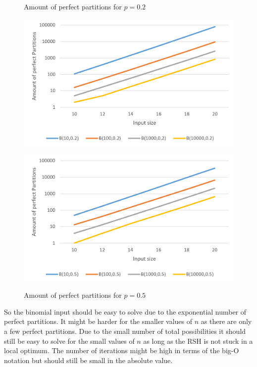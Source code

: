 \begin{figure}[h]
      \centering
      \begin{minipage}[b]{0.45\textwidth}
            \caption{Amount of perfect partitions for $p=0.2$}
            \includegraphics[width=\textwidth]{figures/images/solvabilityOfInputs/perfectPartitionCount-p0_2.png}
      \end{minipage}
      \hspace{0.75cm}
      \begin{minipage}[b]{0.45\textwidth}
            \caption{Amount of perfect partitions for $p=0.5$}
            \includegraphics[width=\textwidth]{figures/images/solvabilityOfInputs/perfectPartitionCount-p0_5.png}\label{fig:lastBinSolCount}
      \end{minipage}
\end{figure}

So the binomial input should be easy to solve due to the exponential number of perfect partitions.
It might be harder for the smaller values of $n$ as there are only a few perfect partitions.
Due to the small number of total possibilities it should still be easy to solve for the small values of $n$ as long as the RSH is not stuck in a local optimum.
The number of iterations might be high in terms of the big-O notation but should still be small in the absolute value.

